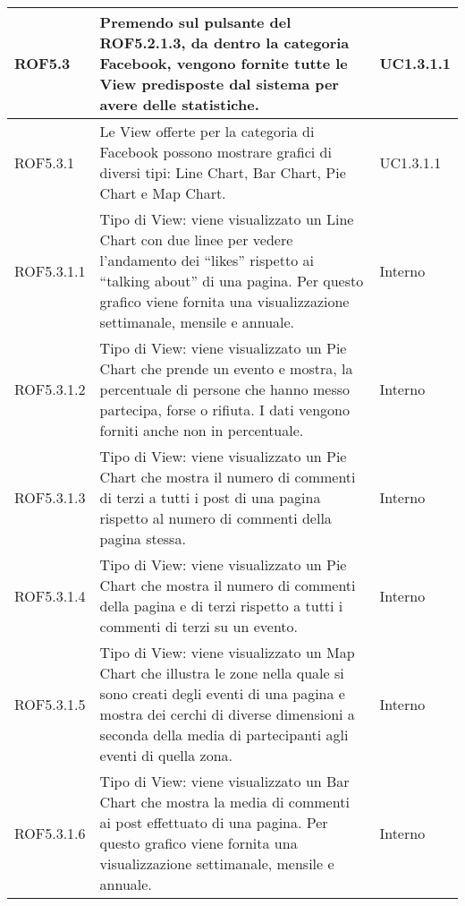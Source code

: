 \begin{center}
\begin{longtable}{| p{2.5cm} | p{8cm} | p{2cm} |}

		ROF5.3  & Premendo sul pulsante del ROF5.2.1.3, da dentro la categoria Facebook, vengono fornite tutte le View predisposte dal sistema per avere delle statistiche. & UC1.3.1.1 \\
		\hline
		ROF5.3.1  & Le View offerte per la categoria di Facebook possono mostrare grafici di diversi tipi: Line Chart, Bar Chart, Pie Chart e Map Chart. &  UC1.3.1.1  \\
		\hline
		ROF5.3.1.1  & Tipo di View: viene visualizzato un Line Chart con due linee per vedere l'andamento dei ``likes'' rispetto ai ``talking about'' di una pagina. Per questo grafico viene fornita una visualizzazione settimanale, mensile e annuale.  & Interno \\
		\hline
		ROF5.3.1.2  &  Tipo di View: viene visualizzato un Pie Chart che prende un evento e mostra, la percentuale di persone che hanno messo partecipa, forse o rifiuta. I dati vengono forniti anche non in percentuale. & Interno \\
		\hline
		ROF5.3.1.3  &  Tipo di View: viene visualizzato un Pie Chart che mostra il numero di commenti di terzi a tutti i post di una pagina rispetto al numero di commenti della pagina stessa. & Interno \\
		\hline
		ROF5.3.1.4  &  Tipo di View: viene visualizzato un Pie Chart che mostra il numero di commenti della pagina e di terzi rispetto a tutti i commenti di terzi su un evento. & Interno \\
		\hline
		ROF5.3.1.5  &  Tipo di View: viene visualizzato un Map Chart che illustra le zone nella quale si sono creati degli eventi di una pagina e mostra dei cerchi di diverse dimensioni a seconda della media di partecipanti agli eventi di quella zona. & Interno \\
		\hline
		ROF5.3.1.6  &  Tipo di View: viene visualizzato un Bar Chart che mostra la media di commenti ai post effettuato di una pagina. Per questo grafico viene fornita una visualizzazione settimanale, mensile e annuale. & Interno \\
		\hline



\end{longtable}
\end{center}
